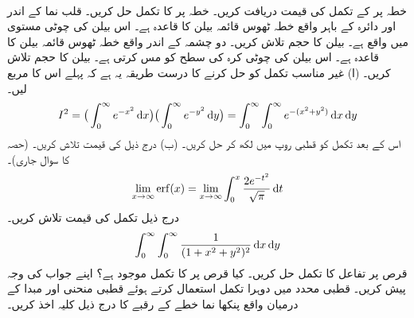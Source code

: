 \\
خطہ  پر    کے تکمل کی قیمت  دریافت کریں۔
\wf{\unexpanded{
$2\pi$
}}
خطہ  پر  کا تکمل حل کریں۔
قلب نما  کے اندر اور دائرہ  کے باہر  واقع خطہ ٹھوس قائمہ بیلن کا قاعدہ ہے۔ اس بیلن کی چوٹی مستوی  میں واقع   ہے۔  بیلن کا حجم تلاش کریں۔ 
دو چشمہ  کے اندر  واقع خطہ ٹھوس قائمہ بیلن کا قاعدہ ہے۔ اس بیلن کی چوٹی کرہ  کی سطح  کو مس کرتی ہے۔ بیلن کا حجم تلاش کریں۔ 
(ا) غیر مناسب تکمل   کو  حل  کرنے کا درست طریقہ یہ ہے کہ پہلے اس کا مربع لیں۔
\begin{align*}
I^2=\big(\int_0^{\infty}e^{-x^2}\dif x\big)\big(\int_0^{\infty}e^{-y^2}\dif y\big)=\int_0^{\infty}\int_0^{\infty}e^{-(x^2+y^2)}\dif x\dif y
\end{align*}
اس کے بعد  تکمل کو قطبی روپ میں لکھ کر حل کریں۔  (ب) درج ذیل کی قیمت تلاش کریں۔  (حصہ  کا سوال  جاری)۔
\begin{align*}
\lim_{x\to\infty}\erf(x)=\lim_{x\to \infty}\int_0^{x}\frac{2e^{-t^2}}{\sqrt{\pi}}\dif t
\end{align*}
درج ذیل تکمل کی قیمت   تلاش   کریں۔
\begin{align*}
\int_{0}^{\infty}\int_{0}^{\infty}\frac{1}{(1+x^2+y^2)^2}\dif x\dif y
\end{align*}
قرص  پر  تفاعل  کا   تکمل حل کریں۔ کیا قرص  پر  کا تکمل موجود ہے؟ اپنے جواب کی وجہ پیش کریں۔
قطبی محدد میں دوہرا تکمل استعمال کرتے ہوئے قطبی   منحنی  اور مبدا کے درمیان واقع  پنکھا نما خطے  کے رقبے کا درج ذیل  کلیہ اخذ کریں۔
